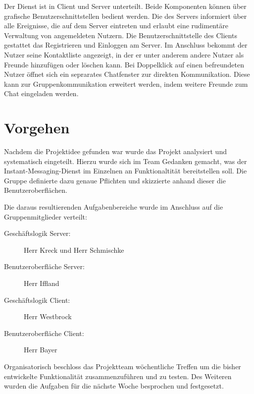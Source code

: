 \documentclass[12pt,a4paper,bibliography=totocnumbered,listof=totocnumbered]{scrartcl}
\begin{document}
Der Dienst ist in Client und Server unterteilt. Beide Komponenten können über grafische Benutzerschnittstellen bedient werden. Die des Servers informiert über alle Ereignisse, die auf dem Server eintreten und erlaubt eine rudimentäre Verwaltung von angemeldeten Nutzern. 
Die Benutzerschnittstelle des Clients gestattet das Registrieren und Einloggen am Server. Im Anschluss bekommt der Nutzer seine Kontaktliste angezeigt, in der er unter anderem andere Nutzer als Freunde hinzufügen oder löschen kann. Bei Doppelklick auf einen befreundeten Nutzer öffnet sich ein seprarates Chatfenster zur direkten Kommunikation. Diese kann zur Gruppenkommunikation erweitert werden, indem weitere Freunde zum Chat eingeladen werden.


\section{Vorgehen}
Nachdem die Projektidee gefunden war wurde das Projekt analysiert und systematisch eingeteilt. Hierzu wurde sich im Team Gedanken gemacht, was 
der Instant-Messaging-Dienst im Einzelnen an Funktionaltität bereitstellen 
soll. Die Gruppe definierte dazu genaue Pflichten und skizzierte anhand dieser die Benutzeroberflächen.

Die daraus resultierenden Aufgabenbereiche wurde im Anschluss auf die Gruppenmitglieder verteilt: 
\begin{description}
	\item[Geschäftslogik Server:] Herr Kreck und Herr Schmischke
	\item[Benutzeroberfläche Server:] Herr Iffland
	\item[Geschäftslogik Client:] Herr Westbrock
	\item[Benutzeroberfläche Client:] Herr Bayer 
\end{description}

Organisatorisch beschloss das Projektteam wöchentliche Treffen um die bisher
entwickelte Funktionalität zusammenzuführen und zu testen. Des Weiteren wurden
die Aufgaben für die nächste Woche besprochen und festgesetzt.
\end{document}
